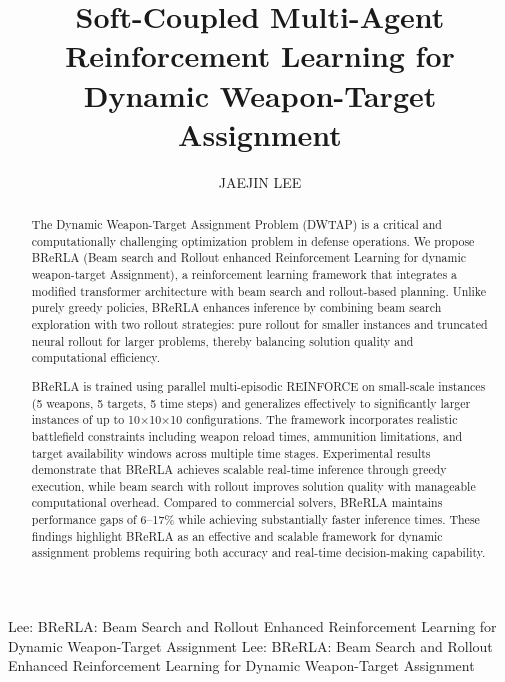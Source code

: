 \documentclass{ieeeaccess}
\begin{document}

\title{Soft-Coupled Multi-Agent Reinforcement Learning for Dynamic Weapon-Target Assignment}

\author{\uppercase{Jaejin Lee}}

\address[1]{Intel Corporation, Chandler, AZ 85226, USA (e-mail: jaejin.lee@intel.com)}



\markboth
{Lee: BReRLA: Beam Search and Rollout Enhanced Reinforcement Learning for Dynamic Weapon-Target Assignment}
{Lee: BReRLA: Beam Search and Rollout Enhanced Reinforcement Learning for Dynamic Weapon-Target Assignment}


\begin{abstract}
The Dynamic Weapon-Target Assignment Problem (DWTAP) is a critical and computationally challenging optimization problem in defense operations. We propose BReRLA (Beam search and Rollout enhanced Reinforcement Learning for dynamic weapon-target Assignment), a reinforcement learning framework that integrates a modified transformer architecture with beam search and rollout-based planning. Unlike purely greedy policies, BReRLA enhances inference by combining beam search exploration with two rollout strategies: pure rollout for smaller instances and truncated neural rollout for larger problems, thereby balancing solution quality and computational efficiency.

BReRLA is trained using parallel multi-episodic REINFORCE on small-scale instances (5 weapons, 5 targets, 5 time steps) and generalizes effectively to significantly larger instances of up to 10×10×10 configurations. The framework incorporates realistic battlefield constraints including weapon reload times, ammunition limitations, and target availability windows across multiple time stages. Experimental results demonstrate that BReRLA achieves scalable real-time inference through greedy execution, while beam search with rollout improves solution quality with manageable computational overhead. Compared to commercial solvers, BReRLA maintains performance gaps of 6--17\% while achieving substantially faster inference times. These findings highlight BReRLA as an effective and scalable framework for dynamic assignment problems requiring both accuracy and real-time decision-making capability.
\end{abstract}
\end{document}
